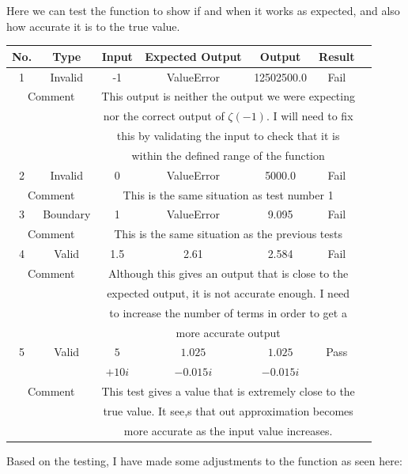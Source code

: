 \documentclass[12pt]{article}
\begin{document}
Here we can test the function to show if and when it works as expected, and also how accurate it is to the true value.
\clearpage
\begin{table}[ht]
    \centering
    \begin{tabular}{|c|c|c|c|c|c|c|}
    \hline
    \textbf{No.} & \textbf{Type} & \textbf{Input} & \textbf{Expected Output} & \textbf{Output} & \textbf{Result}\\
    \hline
    \hline
    1 & Invalid & -1 & ValueError & 12502500.0 & Fail\\
    \hline
    \multicolumn{2}{|c|}{Comment} & \multicolumn{4}{|c|}{This output is neither the output we were expecting}\\
    \multicolumn{2}{|c|}{} & \multicolumn{4}{|c|}{nor the correct output of $\zeta(-1)$. I will need to fix}\\
    \multicolumn{2}{|c|}{} & \multicolumn{4}{|c|}{this by validating the input to check that it is}\\
    \multicolumn{2}{|c|}{} & \multicolumn{4}{|c|}{within the defined range of the function}\\
    \hline
    \hline
    2 & Invalid & 0 & ValueError & 5000.0 & Fail\\
    \hline
    \multicolumn{2}{|c|}{Comment} & \multicolumn{4}{|c|}{This is the same situation as test number 1}\\
    \hline
    \hline
    3 & Boundary & 1 & ValueError & 9.095 & Fail\\
    \hline
    \multicolumn{2}{|c|}{Comment} & \multicolumn{4}{|c|}{This is the same situation as the previous tests}\\
    \hline
    \hline
    4 & Valid & 1.5 & 2.61 & 2.584 & Fail\\
    \hline
    \multicolumn{2}{|c|}{Comment} & \multicolumn{4}{|c|}{Although this gives an output that is close to the}\\
    \multicolumn{2}{|c|}{} & \multicolumn{4}{|c|}{expected output, it is not accurate enough. I need}\\
    \multicolumn{2}{|c|}{} & \multicolumn{4}{|c|}{to increase the number of terms in order to get a}\\
    \multicolumn{2}{|c|}{} & \multicolumn{4}{|c|}{more accurate output}\\
    \hline
    \hline
    5 & Valid & $5$ & $1.025$ & $1.025$ & Pass\\
      & & $+10i$ & $-0.015i$ & $-0.015i$  & \\
    \hline
    \multicolumn{2}{|c|}{Comment} & \multicolumn{4}{|c|}{This test gives a value that is extremely close to the}\\
    \multicolumn{2}{|c|}{} & \multicolumn{4}{|c|}{true value. It see,s that out approximation becomes}\\
    \multicolumn{2}{|c|}{} & \multicolumn{4}{|c|}{more accurate as the input value increases.}\\
    \hline
    \end{tabular}
\end{table}
Based on the testing, I have made some adjustments to the function as seen here:
\end{document}
